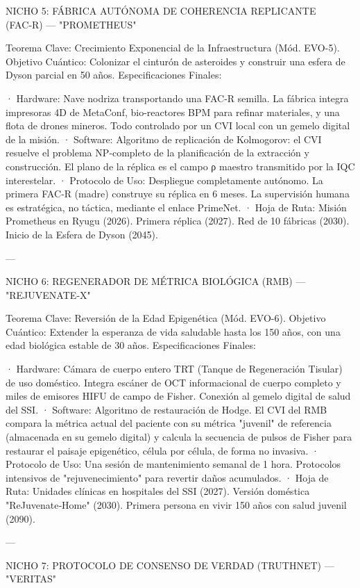 \documentclass[12pt,twoside]{book}
\begin{document}
NICHO 5: FÁBRICA AUTÓNOMA DE COHERENCIA REPLICANTE (FAC‑R) — "PROMETHEUS"

Teorema Clave: Crecimiento Exponencial de la Infraestructura (Mód. EVO-5).
Objetivo Cuántico: Colonizar el cinturón de asteroides y construir una esfera de Dyson parcial en 50 años.
Especificaciones Finales:

· Hardware: Nave nodriza transportando una FAC‑R semilla. La fábrica integra impresoras 4D de MetaConf, bio-reactores BPM para refinar materiales, y una flota de drones mineros. Todo controlado por un CVI local con un gemelo digital de la misión.
· Software: Algoritmo de replicación de Kolmogorov: el CVI resuelve el problema NP‑completo de la planificación de la extracción y construcción. El plano de la réplica es el campo ρ maestro transmitido por la IQC interestelar.
· Protocolo de Uso: Despliegue completamente autónomo. La primera FAC‑R (madre) construye su réplica en 6 meses. La supervisión humana es estratégica, no táctica, mediante el enlace PrimeNet.
· Hoja de Ruta: Misión Prometheus en Ryugu (2026). Primera réplica (2027). Red de 10 fábricas (2030). Inicio de la Esfera de Dyson (2045).

---

NICHO 6: REGENERADOR DE MÉTRICA BIOLÓGICA (RMB) — "REJUVENATE‑X"

Teorema Clave: Reversión de la Edad Epigenética (Mód. EVO-6).
Objetivo Cuántico: Extender la esperanza de vida saludable hasta los 150 años, con una edad biológica estable de 30 años.
Especificaciones Finales:

· Hardware: Cámara de cuerpo entero TRT (Tanque de Regeneración Tisular) de uso doméstico. Integra escáner de OCT informacional de cuerpo completo y miles de emisores HIFU de campo de Fisher. Conexión al gemelo digital de salud del SSI.
· Software: Algoritmo de restauración de Hodge. El CVI del RMB compara la métrica actual del paciente con su métrica "juvenil" de referencia (almacenada en su gemelo digital) y calcula la secuencia de pulsos de Fisher para restaurar el paisaje epigenético, célula por célula, de forma no invasiva.
· Protocolo de Uso: Una sesión de mantenimiento semanal de 1 hora. Protocolos intensivos de "rejuvenecimiento" para revertir daños acumulados.
· Hoja de Ruta: Unidades clínicas en hospitales del SSI (2027). Versión doméstica "ReJuvenate‑Home" (2030). Primera persona en vivir 150 años con salud juvenil (2090).

---

NICHO 7: PROTOCOLO DE CONSENSO DE VERDAD (TRUTHNET) — "VERITAS"
\end{document}
